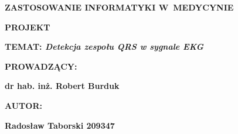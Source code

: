 \clearpage
\thispagestyle{empty}

\begin{center}
	\vspace*{2cm}
	\textbf{{\Huge ZASTOSOWANIE INFORMATYKI W~MEDYCYNIE}}
	
	\vspace{0.8cm}	
	\textbf{{\Huge PROJEKT}}
	
	\vspace{1.6cm}	
	\textbf{{\huge TEMAT:\textit{ Detekcja zespołu QRS w sygnale EKG}}}
	
	\vspace{1.2cm}	
	\textbf{{\LARGE PROWADZĄCY:}}
	
	\vspace{0.1cm}	
	\textbf{{\LARGE dr hab. inż. Robert Burduk}}
\end{center}

\begin{flushright}
	\vspace{7cm}
	\textbf{{\LARGE AUTOR:}}
	
	\vspace{0.1cm}	
	\textbf{{\LARGE Radosław Taborski 209347}}
\end{flushright}


